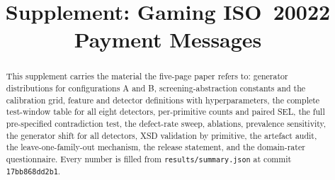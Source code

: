 \documentclass[conference]{IEEEtran}
\newif\ifanonymous
\begin{document}
\title{Supplement: Gaming ISO~20022 Payment Messages}
\ifanonymous
\author{\IEEEauthorblockN{Author names withheld for double-blind review}}
\else
\author{}
\fi
\maketitle
\begin{abstract}
This supplement carries the material the five-page paper refers to: generator
distributions for configurations A and B, screening-abstraction constants and
the calibration grid, feature and detector definitions with hyperparameters,
the complete test-window table for all eight detectors, per-primitive
counts and paired SEL, the full pre-specified contradiction test, the
defect-rate sweep, ablations, prevalence sensitivity, the generator shift for
all detectors, XSD validation by primitive, the artefact audit, the
leave-one-family-out mechanism, the release statement, and the domain-rater
questionnaire. Every number is filled from \texttt{results/summary.json} at
commit \texttt{17bb868dd2b1}.
\end{abstract}
\end{document}
